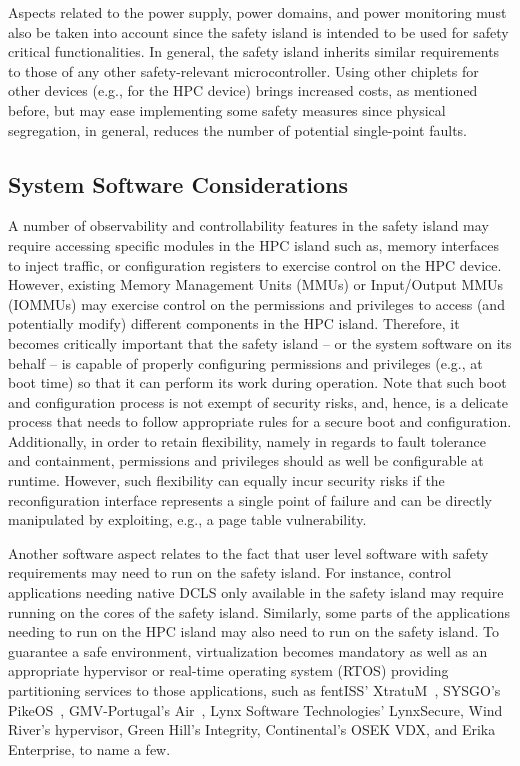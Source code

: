 {Aspects related to the power supply, power domains, and power monitoring must also be taken into account since the safety island is intended to be used for safety critical functionalities. In general, the safety island inherits similar requirements to those of any other safety-relevant microcontroller. Using other chiplets for other devices (e.g., for the HPC device) brings increased costs, as mentioned before, but may ease implementing some safety measures since physical segregation, in general, reduces the number of potential single-point faults.
}


\subsection{System Software Considerations}
A number of observability and controllability features in the safety island may require accessing specific modules in the HPC island such as, memory interfaces to inject traffic, or configuration registers to exercise control on the HPC device. However, existing Memory Management Units (MMUs) or Input/Output MMUs (IOMMUs) may exercise control on the permissions and privileges to access (and potentially modify) different components in the HPC island. Therefore, it becomes critically important that the safety island -- or the system software on its behalf -- is capable of properly configuring permissions and privileges (e.g., at boot time) so that it can perform its work during operation. 
Note that such boot and configuration process is not exempt of security risks, and, hence, is a delicate process that needs to follow appropriate rules for a secure boot and configuration.
Additionally, in order to retain flexibility, namely in regards to fault tolerance and containment, permissions and privileges should as well be configurable at runtime. However, such flexibility can equally incur security risks if the reconfiguration interface represents a single point of failure and can be directly manipulated by exploiting, e.g., a page table vulnerability.

Another software aspect relates to the fact that user level software with safety requirements may need to run on the safety island. For instance, control applications needing native DCLS only available in the safety island may require running on the cores of the safety island. Similarly, some parts of the applications needing to run on the HPC island may also need to run on the safety island. To guarantee a safe environment, virtualization becomes mandatory as well as an appropriate hypervisor or real-time operating system (RTOS) providing partitioning services to those applications, such as fentISS' XtratuM~\cite{xtratum}, SYSGO's PikeOS~\cite{PikeOS}, GMV-Portugal's Air~\cite{GomesOBDP}, Lynx Software Technologies' LynxSecure, Wind River's hypervisor, Green Hill's Integrity, Continental's OSEK VDX, and Erika Enterprise, to name a few. 

